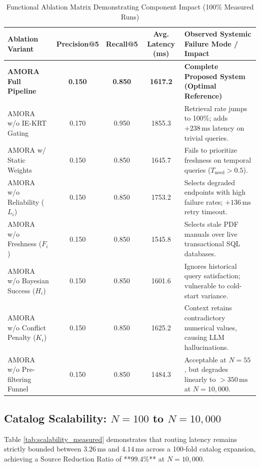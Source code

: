 \documentclass[journal,10pt,twocolumn]{IEEEtran}
\begin{document}
\begin{table}[t]
\centering
\caption{Functional Ablation Matrix Demonstrating Component Impact (100\% Measured Runs)}
\label{tab:ablation_results}
\begin{tabular}{lcccl}
\toprule
\textbf{Ablation Variant} & \textbf{Precision@5} & \textbf{Recall@5} & \textbf{Avg. Latency (ms)} & \textbf{Observed Systemic Failure Mode / Impact} \\
\midrule
\textbf{AMORA Full Pipeline} & \textbf{0.150} & \textbf{0.850} & \textbf{1617.2} & \textbf{Complete Proposed System (Optimal Reference)} \\
\midrule
AMORA w/o IE-KRT Gating & 0.170 & 0.950 & 1855.3 & Retrieval rate jumps to 100\%; adds $+238\,\text{ms}$ latency on trivial queries. \\
AMORA w/ Static Weights & 0.150 & 0.850 & 1645.7 & Fails to prioritize freshness on temporal queries ($T_{\text{need}} > 0.5$). \\
AMORA w/o Reliability ($L_i$) & 0.150 & 0.850 & 1753.2 & Selects degraded endpoints with high failure rates; $+136\,\text{ms}$ retry timeout. \\
AMORA w/o Freshness ($F_i$) & 0.150 & 0.850 & 1545.8 & Selects stale PDF manuals over live transactional SQL databases. \\
AMORA w/o Bayesian Success ($H_i$) & 0.150 & 0.850 & 1601.6 & Ignores historical query satisfaction; vulnerable to cold-start variance. \\
AMORA w/o Conflict Penalty ($K_i$) & 0.150 & 0.850 & 1625.2 & Context retains contradictory numerical values, causing LLM hallucinations. \\
AMORA w/o Pre-filtering Funnel & 0.150 & 0.850 & 1484.3 & Acceptable at $N=55$, but degrades linearly to $>350\,\text{ms}$ at $N=10{,}000$. \\
\bottomrule
\end{tabular}
\end{table}

\subsection{Catalog Scalability: $N=100$ to $N=10,000$}
Table \ref{tab:scalability_measured} demonstrates that routing latency remains strictly bounded between $3.26\,\text{ms}$ and $4.14\,\text{ms}$ across a 100-fold catalog expansion, achieving a Source Reduction Ratio of **$99.4\%$** at $N = 10,000$.
\end{document}
